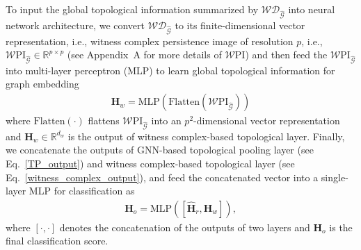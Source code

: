 \documentclass[letterpaper]{article} %
\begin{document}
To input the global topological information summarized by $\mathcal{WD}_{\mathcal{\hat{G}}}$ into neural network architecture, we convert $\mathcal{WD}_{\mathcal{\hat{G}}}$ to its finite-dimensional vector representation, i.e., witness complex persistence image of resolution $p$, i.e., $\mathcal{W}\text{PI}_{\mathcal{\hat{G}}}\in \mathbb{R}^{p \times p}$ (see Appendix~A for more details of $\mathcal{W}\text{PI}$) and then feed the $\mathcal{W}\text{PI}_{\mathcal{\hat{G}}}$ into multi-layer perceptron (MLP) to learn global topological information for graph embedding
\begin{align}
\label{witness_complex_output}
\boldsymbol{H}_w = \text{MLP}(\text{Flatten}(\mathcal{W}\text{PI}_\mathcal{\hat{G}}))
\end{align}
where $\text{Flatten}(\cdot)$ flattens %
$\mathcal{W}\text{PI}_{\mathcal{\hat{G}}}$ into an $p^2$-dimensional vector representation and $\boldsymbol{H}_w \in \mathbb{R}^{d_w}$ is the output of witness complex-based topological layer. Finally, we concatenate the outputs of GNN-based topological pooling layer (see Eq.~\ref{TP_output}) and witness complex-based topological layer (see Eq.~\ref{witness_complex_output}), and feed the concatenated vector into a single-layer MLP for classification as
\begin{align*}
\boldsymbol{H}_o = \text{MLP}([\boldsymbol{\hat{H}}_r, \boldsymbol{H}_w]),
\end{align*}
where $[\cdot,\cdot]$ denotes the concatenation of the outputs of two layers and $\boldsymbol{H}_o$ is the final classification score.
\end{document}
